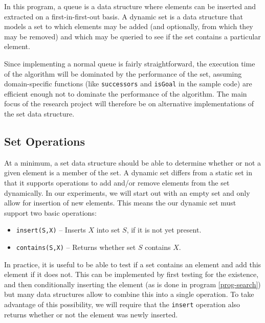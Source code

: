\documentclass{acm_proc_article-sp}
\begin{document}
In this program, a queue is a data structure where elements can be inserted and extracted on a first-in-first-out basis. A dynamic set is a data structure that models a set to which elements may be added (and optionally, from which they may be removed) and which may be queried to see if the set contains a particular element.

Since implementing a normal queue is fairly straightforward, the execution time of the algorithm will be dominated by the performance of the set, assuming domain-specific functions (like \verb#successors# and \verb#isGoal# in the sample code) are efficient enough not to dominate the performance of the algorithm. The main focus of the research project will therefore be on alternative implementations of the set data structure.


\subsection{Set Operations}
At a minimum, a set data structure should be able to determine whether or not a given element is a member of the set. A dynamic set differs from a static set in that it supports operations to add and/or remove elements from the set dynamically. In our experiments, we will start out with an empty set and only allow for insertion of new elements. This means the our dynamic set must support two basic operations:
\begin{itemize}
\item \verb#insert(S,X)# -- Inserts $X$ into set $S$, if it is not yet present.
\item \verb#contains(S,X)# -- Returns whether set $S$ contains $X$.
\end{itemize}
In practice, it is useful to be able to test if a set contains an element and add this element if it does not. This can be implemented by first testing for the existence, and then conditionally inserting the element (as is done in program \ref{prog-search}) but many data structures allow to combine this into a single operation. To take advantage of this possibility, we will require that the \verb#insert# operation also returns whether or not the element was newly inserted.
\end{document}
